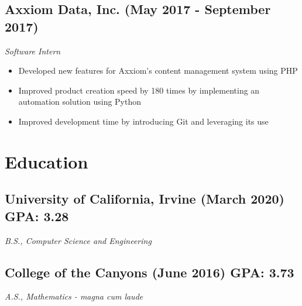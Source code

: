 \documentclass[10pt]{article}
\begin{document}
\subsection{Axxiom Data, Inc. (May 2017 - September 2017)}

\noindent\textit{Software Intern}

\begin{itemize}
	\setlength\itemsep{0em}
	\item Developed new features for Axxiom's content management system using PHP
	\item Improved product creation speed by 180 times by implementing an automation solution using Python
	\item Improved development time by introducing Git and leveraging its use
\end{itemize}

\section{Education}

\subsection{University of California, Irvine (March 2020) \hfill GPA: 3.28}
\noindent\textit{B.S., Computer Science and Engineering}

\subsection{College of the Canyons (June 2016) \hfill GPA: 3.73}
\noindent\textit{A.S., Mathematics - magna cum laude}

\vfill
\end{document}
